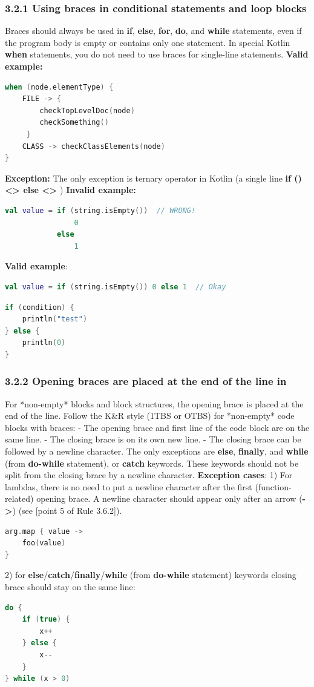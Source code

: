 \subsubsection*{\textbf{3.2.1 Using braces in conditional statements and loop blocks}}
\leavevmode\newline
\label{sec:3.2.1}
Braces should always be used in \textbf{if}, \textbf{else}, \textbf{for}, \textbf{do}, and \textbf{while} statements, even if the program body is empty or contains only one statement. In special Kotlin \textbf{when} statements, you do not need to use braces for single-line statements.
\textbf{Valid example:}
\begin{lstlisting}[language=Kotlin]
when (node.elementType) {
    FILE -> {
        checkTopLevelDoc(node)
        checkSomething()
     }
    CLASS -> checkClassElements(node)
}
\end{lstlisting}
\textbf{Exception:} The only exception is ternary operator in Kotlin (a single line \textbf{if () <> else <>} )
\textbf{Invalid example:}
\begin{lstlisting}[language=Kotlin]
val value = if (string.isEmpty())  // WRONG!
                0
            else
                1
\end{lstlisting}
\textbf{Valid example}:
\begin{lstlisting}[language=Kotlin]
val value = if (string.isEmpty()) 0 else 1  // Okay
\end{lstlisting}
\begin{lstlisting}[language=Kotlin]
if (condition) {
    println("test")
} else {
    println(0)
}
\end{lstlisting}
\subsubsection*{\textbf{3.2.2  Opening braces are placed at the end of the line in}}
\leavevmode\newline
\label{sec:3.2.2}
For *non-empty* blocks and block structures, the opening brace is placed at the end of the line.
Follow the K\&R style (1TBS or OTBS) for *non-empty* code blocks with braces:
- The opening brace and first line of the code block are on the same line.
- The closing brace is on its own new line.
- The closing brace can be followed by a newline character. The only exceptions are \textbf{else}, \textbf{finally}, and \textbf{while} (from \textbf{do-while} statement), or \textbf{catch} keywords.
These keywords should not be split from the closing brace by a newline character.
\textbf{Exception cases}:
1) For lambdas, there is no need to put a newline character after the first (function-related) opening brace. A newline character should appear only after an arrow (\textbf{->}) (see [point 5 of Rule 3.6.2]).
\begin{lstlisting}[language=Kotlin]
arg.map { value ->
    foo(value)
}
\end{lstlisting}
2) for \textbf{else}/\textbf{catch}/\textbf{finally}/\textbf{while} (from \textbf{do-while} statement) keywords closing brace should stay on the same line:
\begin{lstlisting}[language=Kotlin]
do {
    if (true) {
        x++
    } else {
        x--
    }
} while (x > 0)
\end{lstlisting}

